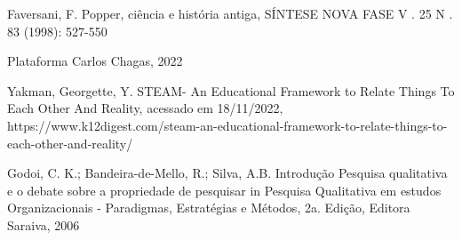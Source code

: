 \documentclass[
12pt,		%
openright,	%
twoside,  %
a4paper,			%
chapter=TITLE,		%
english,			%
french,				%
spanish,			%
brazil				%
]{USPSC-classe/USPSC}
\begin{document}
\begin{flushleft}
\begin{flushleft}
\begin{flushleft}
\begin{flushleft}
[FAVERSANI, 1998] Faversani, F. Popper, ci\^encia e hist\'oria antiga, S\'INTESE NOVA FASE V . 25 N . 83 (1998): 527-550
\end{flushleft}


\end{flushleft}


\end{flushleft}


\end{flushleft}


\begin{flushleft}
\begin{flushleft}
\begin{flushleft}
\begin{flushleft}
[CHAGAS, 2022] Plataforma Carlos Chagas, 2022
\end{flushleft}


\end{flushleft}


\end{flushleft}


\end{flushleft}


\begin{flushleft}
\begin{flushleft}
\begin{flushleft}
\begin{flushleft}
[YAKMAN, 2019] Yakman, Georgette, Y. STEAM- An Educational Framework to Relate Things To Each Other And Reality, acessado em 18/11/2022, https://www.k12digest.com/steam-an-educational-framework-to-relate-things-to-each-other-and-reality/
\end{flushleft}


\end{flushleft}


\end{flushleft}


\end{flushleft}


\begin{flushleft}
\begin{flushleft}
\begin{flushleft}
\begin{flushleft}
[GODOI et al., 2006] Godoi, C. K.; Bandeira-de-Mello, R.; Silva, A.B. Introdu\c{c}\~ao Pesquisa qualitativa e o debate sobre a propriedade de pesquisar in Pesquisa Qualitativa em estudos Organizacionais - Paradigmas, Estrat\'egias e M\'etodos, 2a. Edi\c{c}\~ao, Editora Saraiva, 2006
\end{flushleft}


\end{flushleft}


\end{flushleft}


\end{flushleft}
\end{document}
